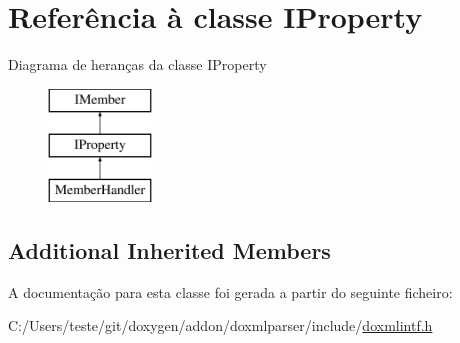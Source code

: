 \hypertarget{class_i_property}{\section{Referência à classe I\-Property}
\label{class_i_property}
}
Diagrama de heranças da classe I\-Property\begin{figure}[H]
\begin{center}
\leavevmode
\includegraphics[height=3.000000cm]{class_i_property}
\end{center}
\end{figure}
\subsection*{Additional Inherited Members}


A documentação para esta classe foi gerada a partir do seguinte ficheiro\-:\begin{DoxyCompactItemize}
\item 
C\-:/\-Users/teste/git/doxygen/addon/doxmlparser/include/\hyperlink{include_2doxmlintf_8h}{doxmlintf.\-h}\end{DoxyCompactItemize}
